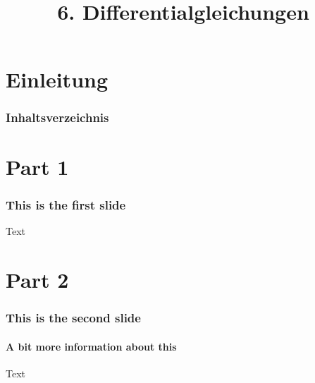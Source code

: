 

\title{\\{\scriptsize 6. Differentialgleichungen}}


  

    \section{Einleitung}
    \begin{frame}
        \frametitle{Inhaltsverzeichnis}
        \tableofcontents[currentsection]
    \end{frame}

    \section{Part 1}
    \begin{frame}
        \frametitle{This is the first slide}
        Text
    \end{frame}

    \section{Part 2}
    \begin{frame}
        \frametitle{This is the second slide}
        \framesubtitle{A bit more information about this}
        Text
    \end{frame}

